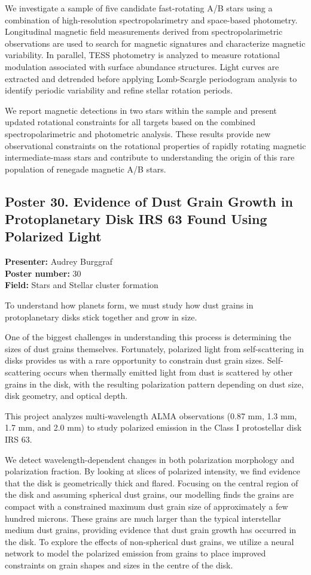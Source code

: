 We investigate a sample of five candidate fast-rotating A/B stars using a combination of high-resolution spectropolarimetry and space-based photometry. Longitudinal magnetic field measurements derived from spectropolarimetric observations are used to search for magnetic signatures and characterize magnetic variability. In parallel, TESS photometry is analyzed to measure rotational modulation associated with surface abundance structures. Light curves are extracted and detrended before applying Lomb-Scargle periodogram analysis to identify periodic variability and refine stellar rotation periods.

We report magnetic detections in two stars within the sample and present updated rotational constraints for all targets based on the combined spectropolarimetric and photometric analysis. These results provide new observational constraints on the rotational properties of rapidly rotating magnetic intermediate-mass stars and contribute to understanding the origin of this rare population of renegade magnetic A/B stars.

\hypertarget{poster-abstract-talk-302}{}\label{poster-abstract-page-talk-302}
\subsection*{Poster 30. Evidence of Dust Grain Growth in Protoplanetary Disk IRS 63 Found Using Polarized Light}
\textbf{Presenter:} Audrey Burggraf\\
\textbf{Poster number:} 30\\
\textbf{Field:} Stars and Stellar cluster formation

To understand how planets form, we must study how dust grains in protoplanetary disks stick together and grow in size.

One of the biggest challenges in understanding this process is determining the sizes of dust grains themselves. Fortunately, polarized light from self-scattering in disks provides us with a rare opportunity to constrain dust grain sizes. Self-scattering occurs when thermally emitted light from dust is scattered by other grains in the disk, with the resulting polarization pattern depending on dust size, disk geometry, and optical depth.

This project analyzes multi-wavelength ALMA observations (0.87 mm, 1.3 mm, 1.7 mm, and 2.0 mm) to study polarized emission in the Class I protostellar disk IRS 63.

We detect wavelength-dependent changes in both polarization morphology and polarization fraction. By looking at slices of polarized intensity, we find evidence that the disk is geometrically thick and flared. Focusing on the central region of the disk and assuming spherical dust grains, our modelling finds the grains are compact with a constrained maximum dust grain size of approximately a few hundred microns. These grains are much larger than the typical interstellar medium dust grains, providing evidence that dust grain growth has occurred in the disk. To explore the effects of non-spherical dust grains, we utilize a neural network to model the polarized emission from grains to place improved constraints on grain shapes and sizes in the centre of the disk.

